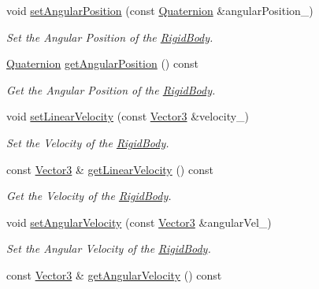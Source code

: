 \begin{DoxyCompactItemize}
void \hyperlink{class_magnum_1_1_physics3_1_1_vehicle_ae98489afb5ca9374916373081c3a54bf}{set\+Angular\+Position} (const \hyperlink{class_magnum_1_1_quaternion}{Quaternion} \&angular\+Position\+\_\+)
\begin{DoxyCompactList}\small\item\em Set the Angular Position of the \hyperlink{class_magnum_1_1_physics3_1_1_rigid_body}{Rigid\+Body}. \end{DoxyCompactList}\item 
\hyperlink{class_magnum_1_1_quaternion}{Quaternion} \hyperlink{class_magnum_1_1_physics3_1_1_vehicle_a258898ba73cb4c5a00778a957aee0eb3}{get\+Angular\+Position} () const 
\begin{DoxyCompactList}\small\item\em Get the Angular Position of the \hyperlink{class_magnum_1_1_physics3_1_1_rigid_body}{Rigid\+Body}. \end{DoxyCompactList}\item 
void \hyperlink{class_magnum_1_1_physics3_1_1_vehicle_ad2dc2a027e33b880e030ac6778f53679}{set\+Linear\+Velocity} (const \hyperlink{class_magnum_1_1_vector3}{Vector3} \&velocity\+\_\+)
\begin{DoxyCompactList}\small\item\em Set the Velocity of the \hyperlink{class_magnum_1_1_physics3_1_1_rigid_body}{Rigid\+Body}. \end{DoxyCompactList}\item 
const \hyperlink{class_magnum_1_1_vector3}{Vector3} \& \hyperlink{class_magnum_1_1_physics3_1_1_vehicle_a7b9d8792970f5caf9e700db81d90af57}{get\+Linear\+Velocity} () const 
\begin{DoxyCompactList}\small\item\em Get the Velocity of the \hyperlink{class_magnum_1_1_physics3_1_1_rigid_body}{Rigid\+Body}. \end{DoxyCompactList}\item 
void \hyperlink{class_magnum_1_1_physics3_1_1_vehicle_a979a75f5e95607530dca187641e7e25e}{set\+Angular\+Velocity} (const \hyperlink{class_magnum_1_1_vector3}{Vector3} \&angular\+Vel\+\_\+)
\begin{DoxyCompactList}\small\item\em Set the Angular Velocity of the \hyperlink{class_magnum_1_1_physics3_1_1_rigid_body}{Rigid\+Body}. \end{DoxyCompactList}\item 
const \hyperlink{class_magnum_1_1_vector3}{Vector3} \& \hyperlink{class_magnum_1_1_physics3_1_1_vehicle_add0e84a198b96736e615042eb7a24628}{get\+Angular\+Velocity} () const 

\end{DoxyCompactItemize}

